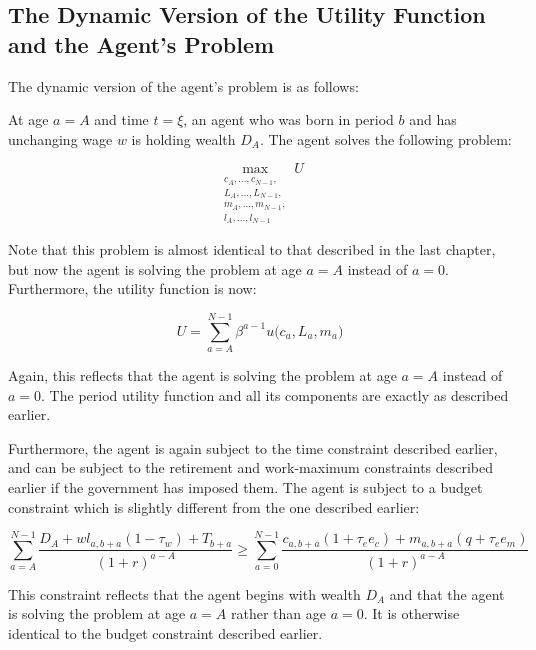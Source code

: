 \documentclass[letter, 12pt, epsf,leqno]{article}
\begin{document}
\subsection{The Dynamic Version of the Utility Function and the Agent's Problem}

The dynamic version of the agent's problem is as follows:\par
At age $a=A$ and time $t=\xi$, an agent who was born in period $b$ and has unchanging wage $w$ is holding wealth $D_A$. The agent solves the following problem:

\begin{equation}\max_{\substack{c_A,...,c_{N-1},\\ L_A,...,L_{N-1},\\m_A,...,m_{N-1},\\ l_A,...,l_{N-1}}} U\end{equation}

Note that this problem is almost identical to that described in the last chapter, but now the agent is solving the problem at age $a=A$ instead of $a=0$.  Furthermore, the utility function is now:

\begin{equation}U = \sum_{a=A}^{{N-1}} \beta^{a-1} u\Big(c_{a}, L_{a}, m_{a}\Big)\end{equation}

Again, this reflects that the agent is solving the problem at age $a=A$ instead of $a=0$.  The period utility function and all its components are exactly as described earlier.\par

Furthermore, the agent is again subject to the time constraint described earlier, and can be subject to the retirement and work-maximum constraints described earlier if the government has imposed them.  The agent is subject to a budget constraint which is slightly different from the one described earlier:

\begin{equation}\sum_{a=A}^{N-1} \frac{D_A + wl_{a, b+a} (1-\tau_w)+T_{b+a}}{(1+r)^{a-A}}  \ge \sum_{a=0}^{N-1} \frac{c_{a, b+a}(1+\tau_e e_c)+m_{a, b+a}(q+\tau_e e_m)}{(1+r)^{a-A}}\end{equation}

This constraint reflects that the agent begins with wealth $D_A$ and that the agent is solving the problem at age $a=A$ rather than age $a=0$.  It is otherwise identical to the budget constraint described earlier.
\end{document}
